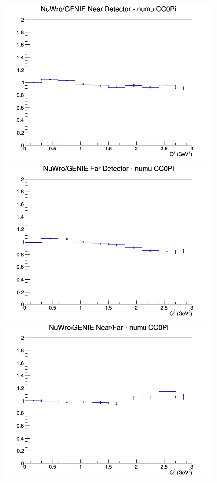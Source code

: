 \documentclass[12pt]{article}
\begin{document}
\begin{figure}[h]
\endminipage
\newline
{}
\includegraphics[width=\linewidth]{eff_Q2/LAr/ratios/CC0Pi_NuWro_GENIE_numu_near_Q2.png}
\endminipage
{}
\includegraphics[width=\linewidth]{eff_Q2/LAr/ratios/CC0Pi_NuWro_GENIE_numu_far_Q2.png}
\endminipage
{}
\includegraphics[width=\linewidth]{eff_Q2/LAr/ratios/CC0Pi_NuWro_GENIE_numu_NF_Q2.png}
\endminipage
\newline
\end{figure}
\clearpage
\end{document}
